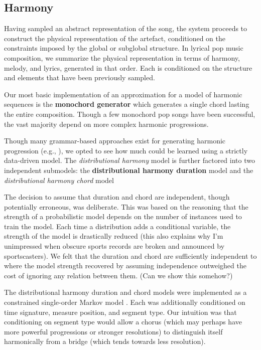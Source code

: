 \documentclass[letterpaper]{article}
\begin{document}
\subsection{Harmony}

Having sampled an abstract representation of the song, the system proceeds to construct the physical representation of the artefact, conditioned on the constraints imposed by the global or subglobal structure. In lyrical pop music composition, we summarize the physical representation in terms of harmony, melody, and lyrics, generated in that order. Each is conditioned on the structure and elements that have been previously sampled.

Our most basic implementation of an approximation for a model of harmonic sequences is the \textbf{monochord generator} which generates a single chord lasting the entire composition. Though a few monochord pop songs have been successful, the vast majority depend on more complex harmonic progressions. 

Though many grammar-based approaches exist for generating harmonic progression (e.g., \cite{steedman1984generative}), we opted to see how much could be learned using a strictly data-driven model. The \textit{distributional harmony} model is further factored into two independent submodels: the \textbf{distributional harmony duration} model and the \textit{distributional harmony chord} model

The decision to assume that duration and chord are independent, though potentially erroneous, was deliberate. This was based on the reasoning that the strength of a probabilistic model depends on the number of instances used to train the model. Each time a distribution adds a conditional variable, the strength of the model is drastically reduced (this also explains why I'm unimpressed when obscure sports records are broken and announced by sportscasters). We felt that the duration and chord are sufficiently independent to where the model strength recovered by assuming independence outweighed the cost of ignoring any relation between them. (Can we show this somehow?)

The distributional harmony duration and chord models were implemented as a constrained single-order Markov model \cite{pachet2001finite}. Each was additionally conditioned on time signature, measure position, and segment type. Our intuition was that conditioning on segment type would allow a chorus (which may perhaps have more powerful progressions or stronger resolutions) to distinguish itself harmonically from a bridge (which tends towards less resolution).
\end{document}

